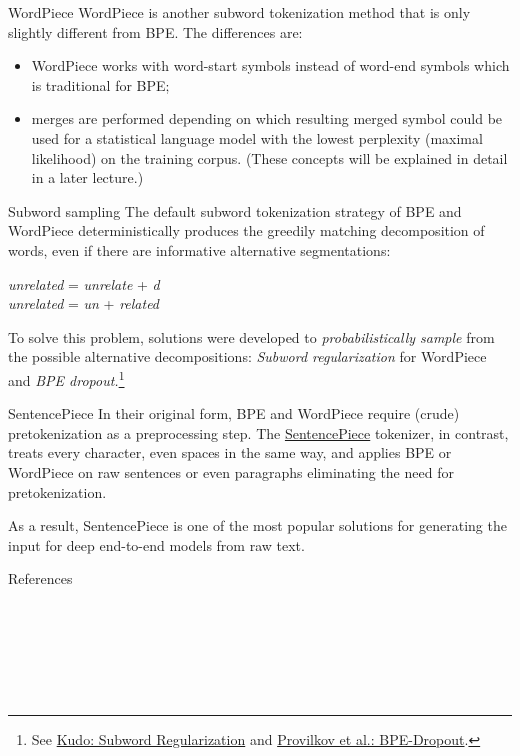 \documentclass[style=upen, size=14pt]{powerdot}
\theoremstyle{definition}
\begin{document}
\begin{slide}[toc=WordPiece]{WordPiece}
  WordPiece is another subword tokenization method that is only slightly
  different from BPE. The differences are:
  \begin{itemize}
  \item WordPiece works with word-start symbols instead of word-end symbols which is
    traditional for BPE;
  \item merges are performed depending on which resulting merged symbol could be
    used for a statistical language model with the lowest perplexity (maximal
    likelihood) on the training corpus. (These concepts will be explained in
    detail in a later lecture.)
  \end{itemize}
\end{slide}

\begin{slide}[toc=Subword sampling]{Subword sampling}
  The default subword tokenization strategy of BPE and WordPiece
  deterministically produces the greedily matching decomposition of words, even
  if there are informative alternative segmentations:
  \begin{center}
    \emph{unrelated} = \emph{unrelate} + \emph{d} \\
    \emph{unrelated} = \emph{un} + \emph{related}
  \end{center}
  To solve this problem, solutions were developed to \emph{probabilistically
    sample} from the possible alternative decompositions: \emph{Subword
    regularization} for WordPiece and \emph{BPE dropout.}\footnote{See \href{https://arxiv.org/pdf/1804.10959.pdf}{Kudo: Subword Regularization} and \href{https://arxiv.org/pdf/1910.13267.pdf}{Provilkov et al.: BPE-Dropout}.}
\end{slide}

\begin{slide}[toc=SentencePiece]{SentencePiece}
  In their original form, BPE and WordPiece require (crude) pretokenization as a
  preprocessing step. The
  \href{https://github.com/google/sentencepiece}{SentencePiece} tokenizer, in
  contrast, treats every character, even spaces in the same way, and applies BPE
  or WordPiece on raw sentences or even paragraphs eliminating the need for
  pretokenization.

  As a result, SentencePiece is one of the most popular solutions for generating
  the input for deep end-to-end models from raw text.
\end{slide}

\begin{slide}{References}
  
  \begin{scriptsize}
     \\ \medskip
     \\ \medskip
     \\ \medskip
     \\ \medskip
     \\
  \end{scriptsize}
\end{slide}
\end{document}
